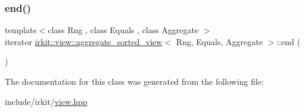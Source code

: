 \subsubsection{\texorpdfstring{end()}{end()}}
{\footnotesize\ttfamily template$<$class Rng , class Equals , class Aggregate $>$ \\
iterator \hyperlink{classirkit_1_1view_1_1aggregate__sorted__view}{irkit\+::view\+::aggregate\+\_\+sorted\+\_\+view}$<$ Rng, Equals, Aggregate $>$\+::end (\begin{DoxyParamCaption}{ }\end{DoxyParamCaption})\hspace{0.3cm}{\ttfamily [inline]}}



The documentation for this class was generated from the following file\+:\begin{DoxyCompactItemize}
\item 
include/irkit/\hyperlink{view_8hpp}{view.\+hpp}\end{DoxyCompactItemize}
